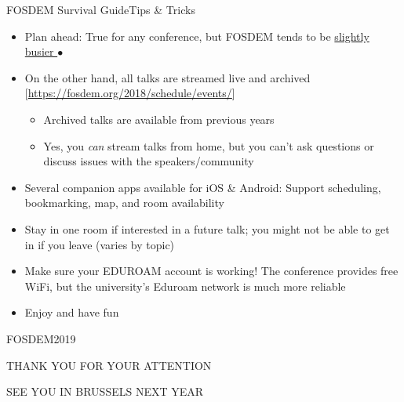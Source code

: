 \documentclass[10pt]{beamer}
\begin{document}
\begin{frame}{FOSDEM Survival Guide}{Tips \& Tricks}
    \begin{itemize}
        \item Plan ahead: True for any conference, but FOSDEM tends to be \href{./photos/room-full.jpg}{slightly busier $\bullet$}
        \item On the other hand, all talks are streamed live and archived [\url{https://fosdem.org/2018/schedule/events/}]
            \begin{itemize}
                \item Archived talks are available from previous years
                \item Yes, you \emph{can} stream talks from home, but you can't ask questions or discuss issues with the speakers/community
            \end{itemize}
        \item Several companion apps available for iOS \& Android: Support scheduling, bookmarking, map, and room availability
        \item Stay in one room if interested in a future talk; you might not be able to get in if you leave (varies by topic)
        \item Make sure your EDUROAM account is working! The conference provides free WiFi, but the university's Eduroam network is much more reliable
        \item Enjoy and have fun
    \end{itemize}
\end{frame}

\begin{frame}{FOSDEM}{2019}
    \begin{center}
        THANK YOU FOR YOUR ATTENTION

        SEE YOU IN BRUSSELS NEXT YEAR
    \end{center}
\end{frame}


\end{document}
